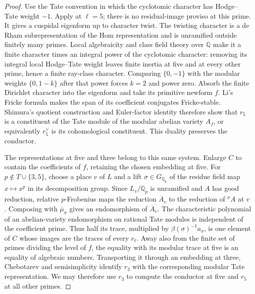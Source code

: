 \documentclass[11pt]{article}
\theoremstyle{definition}
\theoremstyle{remark}
\begin{document}
\begin{proof}
Use the Tate convention in which the cyclotomic character has
Hodge--Tate weight $-1$. Apply \cite[Theorem 1.0.4]{pan2022} at
$\ell=5$; there is no residual-image proviso at this prime.
It gives a cuspidal eigenform up to character twist. The twisting
character is a de Rham subrepresentation of the Hom representation
and is unramified outside finitely many primes. Local algebraicity
\cite[Appendix B, pp.~32--33]{conrad-local-characters} and class field
theory over $\mathbb Q$ make it a finite character times an integral
power of the cyclotomic character: removing its integral local
Hodge--Tate weight leaves finite inertia at five and at every other
prime, hence a finite ray-class character. Comparing $\{0,-1\}$
with the modular weights $\{0,1-k\}$ after that power forces
$k=2$ and power zero. Absorb the finite Dirichlet character into
the eigenform and take its primitive newform $f$. Li's Fricke formula
\cite[p.~296, before Lemma 6]{li-newforms} makes the span of its
coefficient conjugates Fricke-stable. Shimura's quotient construction
and Euler-factor identity \cite[Theorem 1]{shimura-factors} therefore
show that $r_5$ is a constituent of the Tate module of the modular abelian variety
$A_f$, or equivalently $r_5^\vee$ is its cohomological constituent.
This duality preserves the conductor.

The representations at five and three belong to this same system.
Enlarge $C$ to contain the coefficients of $f$, retaining the chosen
embedding at five. For $p\notin T\cup\{3,5\}$, choose a place $v$
of $L$ and a lift $\sigma\in G_{\mathbb Q_p}$ of the residue
field map $x\mapsto x^p$ in its decomposition group. Since
$L_v/\mathbb Q_p$ is unramified and $A$ has good reduction,
relative $p$-Frobenius maps the reduction $\overline A_v$ to
the reduction of ${}^\sigma A$ at $v$. Composing with
$\overline\mu_\sigma$ gives an endomorphism of $\overline A_v$.
The characteristic polynomial of an abelian-variety endomorphism
on rational Tate modules is independent of the coefficient prime.
Thus half its trace, multiplied by $\beta(\sigma)^{-1}a_\sigma$,
is one element of $C$ whose images are the traces of every $r_\ell$.
Away also from the finite set of primes dividing the level of $f$,
the equality with its modular trace at five is an equality of
algebraic numbers. Transporting it through an embedding at three,
Chebotarev and semisimplicity identify $r_3$ with the corresponding
modular Tate representation. We may therefore use $r_3$ to compute
the conductor at five and $r_5$ at all other primes.


\end{proof}
\end{document}
